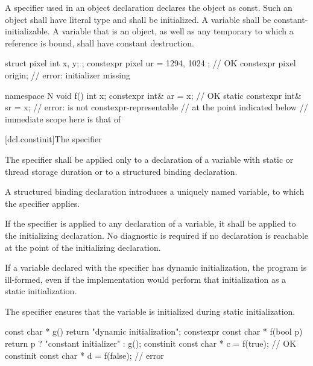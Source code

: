 \pnum
A  specifier used in an object declaration
declares the object as const.
Such an object
shall have literal type and
shall be initialized.
A  variable shall be constant-initializable.
A  variable that is an object,
as well as any temporary to which a  reference is bound,
shall have constant destruction.
\begin{example}
\begin{codeblock}
struct pixel {
  int x, y;
};
constexpr pixel ur = { 1294, 1024 };    // OK
constexpr pixel origin;                 // error: initializer missing

namespace N {
  void f() {
    int x;
    constexpr int& ar = x;              // OK
    static constexpr int& sr = x;       // error:  is not constexpr-representable
                                        // at the point indicated below
  }
  // immediate scope here is that of 
}
\end{codeblock}
\end{example}

[dcl.constinit]{The  specifier}

\pnum
The  specifier shall be applied only
to a declaration of a variable with static or thread storage duration
or to a structured binding declaration.
\begin{note}
A structured binding declaration introduces a uniquely named variable,
to which the  specifier applies.
\end{note}
If the specifier is applied to any declaration of a variable,
it shall be applied to the initializing declaration.
No diagnostic is required if no  declaration
is reachable at the point of the initializing declaration.

\pnum
If a variable declared with the  specifier has
dynamic initialization, the program is ill-formed,
even if the implementation would perform that initialization as
a static initialization.
\begin{note}
The  specifier ensures that the variable
is initialized during static initialization.
\end{note}

\pnum
\begin{example}
\begin{codeblock}
const char * g() { return "dynamic initialization"; }
constexpr const char * f(bool p) { return p ? "constant initializer" : g(); }
constinit const char * c = f(true);     // OK
constinit const char * d = f(false);    // error
\end{codeblock}
\end{example}

